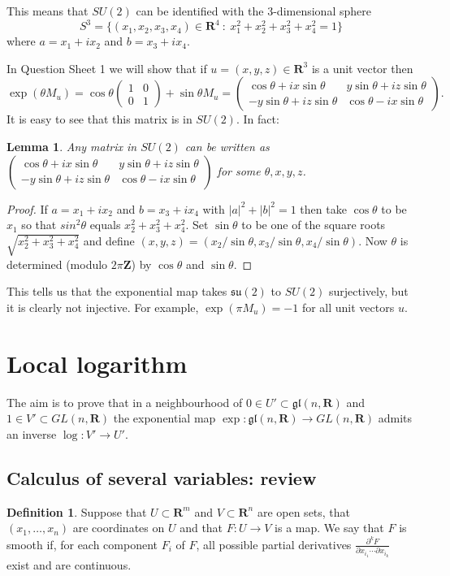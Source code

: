 \documentclass[12pt]{article}
\newcommand{\RR}{\mathbf{R}}
\newcommand{\ZZ}{\mathbf{Z}}
\newcommand{\matr}[4]{\left(\begin{array}{cc}#1 & #2\\ #3 & #4\end{array}\right)}
\newtheorem{lma}[thm]{Lemma}
\theoremstyle{definition}
\newtheorem{dfn}[thm]{Definition}
\theoremstyle{check}
\theoremstyle{remark}
\theoremstyle{TheoremNum}
\begin{document}
This means that $SU(2)$ can be identified with the 3-dimensional sphere
\[S^3=\{(x_1,x_2,x_3,x_4)\in\RR^4\ :\ x_1^2+x_2^2+x_3^2+x_4^2=1\}\]
where $a=x_1+ix_2$ and $b=x_3+ix_4$.

In Question Sheet 1 we will show that if $u=(x,y,z)\in\RR^3$ is a unit vector then
\[\exp(\theta M_u)=\cos\theta \matr{1}{0}{0}{1}+\sin\theta M_u=\matr{\cos\theta+ix\sin\theta}{y\sin\theta+iz\sin\theta}{-y\sin\theta+iz\sin\theta}{\cos\theta-ix\sin\theta}.\]
It is easy to see that this matrix is in $SU(2)$. In fact:
\begin{lma}
Any matrix in $SU(2)$ can be written as $\matr{\cos\theta+ix\sin\theta}{y\sin\theta+iz\sin\theta}{-y\sin\theta+iz\sin\theta}{\cos\theta-ix\sin\theta}$ for some $\theta,x,y,z$.
\end{lma}
\begin{proof}
If $a=x_1+ix_2$ and $b=x_3+ix_4$ with $|a|^2+|b|^2=1$ then take $\cos\theta$ to be $x_1$ so that $sin^2\theta$ equals $x_2^2+x_3^2+x_4^2$. Set $\sin\theta$ to be one of the square roots $\sqrt{x_2^2+x_3^2+x_4^2}$ and define $(x,y,z)=(x_2/\sin\theta,x_3/\sin\theta,x_4/\sin\theta)$. Now $\theta$ is determined (modulo $2\pi\ZZ$) by $\cos\theta$ and $\sin\theta$.
\end{proof}

This tells us that the exponential map takes $\mathfrak{su}(2)$ to $SU(2)$ surjectively, but it is clearly not injective. For example, $\exp(\pi M_u)=-1$ for all unit vectors $u$.



\section{Local logarithm}

The aim is to prove that in a neighbourhood of $0\in U'\subset\mathfrak{gl}(n,\RR)$ and $1\in V'\subset GL(n,\RR)$ the exponential map $\exp\colon\mathfrak{gl}(n,\RR)\to GL(n,\RR)$ admits an inverse $\log\colon V'\to U'$.

\subsection{Calculus of several variables: review}

\begin{dfn}
Suppose that $U\subset\RR^m$ and $V\subset\RR^n$ are open sets, that $(x_1,\ldots,x_n)$ are coordinates on $U$ and that $F\colon U\to V$ is a map. We say that $F$ is smooth if, for each component $F_i$ of $F$, all possible partial derivatives $\frac{\partial^k F}{\partial x_{i_1}\cdots\partial x_{i_k}}$ exist and are continuous.
\end{dfn}
\end{document}
